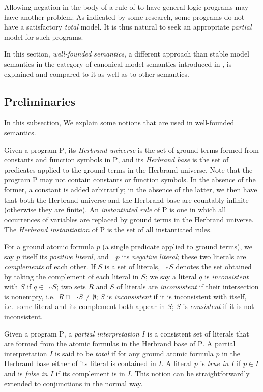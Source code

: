 Allowing negation in the body of a rule of to have general logic programs may have another problem: As indicated by some research, some programs do not have a satisfactory \emph{total} model. It is thus natural to seek an appropriate \emph{partial} model for such programs.

In this section, \emph{well-founded semantics}, a different approach than stable model semantics in the category of canonical model semantics introduced in \cite{VanGelder}, is explained and compared to it as well as to other semantics.

\subsection{Preliminaries}
In this subsection, We explain some notions that are used in well-founded semantics.

Given a program $\mathrm{P}$, its \emph{Herbrand universe} is the set of ground terms formed from constants and function symbols in $\mathrm{P}$, and its \emph{Herbrand base} is the set of predicates applied to the ground terms in the Herbrand universe. Note that the program $\mathrm{P}$ may not contain constants or function symbols. In the absence of the former, a constant is added arbitrarily; in the absence of the latter, we then have that both the Herbrand universe and the Herbrand base are countably infinite (otherwise they are finite). An \emph{instantiated rule} of $\mathrm{P}$ is one in which all occurrences of variables are replaced by ground terms in the Herbrand universe. The \emph{Herbrand instantiation} of $\mathrm{P}$ is the set of all instantiated rules.

For a ground atomic formula $p$ (a single predicate applied to ground terms), we say $p$ itself its \emph{positive literal}, and $\neg p$ its \emph{negative literal}; these two literals are \emph{complements} of each other. If $S$ is a set of literals, $\neg \cdot S$ denotes the set obtained by taking the complement of each literal in $S$; we say a literal $q$ is \emph{inconsistent} with $S$ if $q \in \neg \cdot S$; two sets $R$ and $S$ of literals are \emph{inconsistent} if their intersection is nonempty, i.e.\ $R \cap \neg \cdot S \neq \emptyset$; $S$ is \emph{inconsistent} if it is inconsistent with itself, i.e.\ some literal and its complement both appear in $S$; $S$ is \emph{consistent} if it is not inconsistent.

Given a program $\mathrm{P}$, a \emph{partial interpretation} $I$ is a consistent set of literals that are formed from the atomic formulas in the Herbrand base of $\mathrm{P}$. A partial interpretation $I$ is said to be \emph{total} if for any ground atomic formula $p$ in the Herbrand base either of its literal is contained in $I$. A literal $p$ is \emph{true in $I$} if $p \in I$ and is \emph{false in $I$} if its complement is in $I$. This notion can be straightforwardly extended to conjunctions in the normal way.

